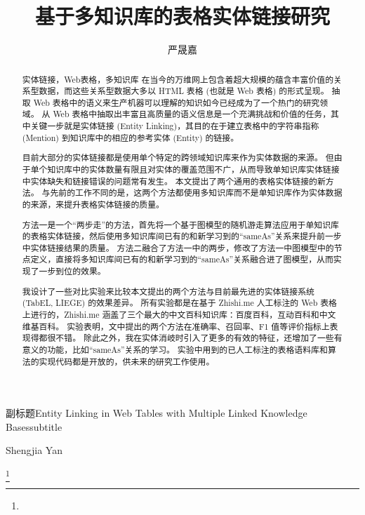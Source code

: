 \documentclass[bachelor, printoneside]{seuthesis} %
\begin{document}

\title{基于多知识库的表格实体链接研究}{副标题}{Entity Linking in Web Tables with Multiple Linked Knowledge Bases}{subtitle}
\author{严晟嘉}{Shengjia Yan}

\address{东南大学九龙湖校区}
\thanks{}
\maketitle

\begin{abstract}{实体链接，Web表格，多知识库}
在当今的万维网上包含着超大规模的蕴含丰富价值的关系型数据，而这些关系型数据大多以 HTML 表格 (也就是 Web 表格) 的形式呈现。
抽取 Web 表格中的语义来生产机器可以理解的知识如今已经成为了一个热门的研究领域。
从 Web 表格中抽取出丰富且高质量的语义信息是一个充满挑战和价值的任务，其中关键一步就是实体链接 (Entity Linking)，其目的在于建立表格中的字符串指称 (Mention) 到知识库中的相应的参考实体 (Entity) 的链接。\par

目前大部分的实体链接都是使用单个特定的跨领域知识库来作为实体数据的来源。
但由于单个知识库中的实体数量有限且对实体的覆盖范围不广，从而导致单知识库实体链接中实体缺失和链接错误的问题常有发生。
本文提出了两个通用的表格实体链接的新方法。
与先前的工作不同的是，这两个方法都使用多知识库而不是单知识库作为实体数据的来源，来提升表格实体链接的质量。\par

方法一是一个``两步走''的方法，首先将一个基于图模型的随机游走算法应用于单知识库的表格实体链接，然后使用多知识库间已有的和新学习到的``sameAs''关系来提升前一步中实体链接结果的质量。
方法二融合了方法一中的两步，修改了方法一中图模型中的节点定义，直接将多知识库间已有的和新学习到的``sameAs''关系融合进了图模型，从而实现了一步到位的效果。\par

我设计了一些对比实验来比较本文提出的两个方法与目前最先进的实体链接系统 (TabEL, LIEGE) 的效果差异。
所有实验都是在基于 Zhishi.me 人工标注的 Web 表格上进行的，Zhishi.me 涵盖了三个最大的中文百科知识库：百度百科，互动百科和中文维基百科。
实验表明，文中提出的两个方法在准确率、召回率、F1 值等评价指标上表现得都很不错。
除此之外，我在实体消岐时引入了更多的有效的特征，还增加了一些有意义的功能，比如``sameAs''关系的学习。
实验中用到的已人工标注的表格语料库和算法的实现代码都是开放的，供未来的研究工作使用。
\end{abstract}
\end{document}
